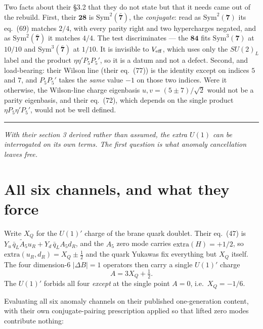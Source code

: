 \documentclass[11pt,a4paper]{article}
\newcommand{\su}[1]{SU(#1)}
\newcommand{\rep}[1]{\mathbf{#1}}
\newcommand{\bridge}[1]{\par\medskip\noindent
  \textcolor{hdrblue!45}{\rule{2.2cm}{0.6pt}}\;\;\parbox[t]{0.84\textwidth}{\small\itshape
  \textcolor{hdrblue!85}{#1}}\par\medskip}
\begin{document}
Two facts about their \S3.2 that they do not state but that it needs came out of the rebuild. First,
their $\rep{28}$ is $\mathrm{Sym}^2(\rep{\bar7})$, the \emph{conjugate}: read as
$\mathrm{Sym}^2(\rep7)$ its eq.~(69) matches $2/4$, with every parity right and two hypercharges
negated, and as $\mathrm{Sym}^2(\rep{\bar7})$ it matches $4/4$. The test discriminates --- the
$\rep{84}$ fits $\mathrm{Sym}^3(\rep7)$ at $10/10$ and $\mathrm{Sym}^3(\rep{\bar7})$ at $1/10$. It
is invisible to $V_{\rm eff}$, which uses only the $\su2_L$ label and the product
$\eta\eta'P_5P_5'$, so it is a datum and not a defect. Second, and load-bearing: their Wilson line
(their eq.~(77)) is the identity except on indices $5$ and $7$, and $P_5P_5'$ takes the \emph{same}
value $-1$ on those two indices. Were it otherwise, the Wilson-line charge eigenbasis
$u,v=(5\pm7)/\sqrt2$ would not be a parity eigenbasis, and their eq.~(72), which depends on the
single product $\eta P_5\eta'P_5'$, would not be well defined.

\bridge{With their section 3 derived rather than assumed, the extra $U(1)$ can be interrogated on
its own terms. The first question is what anomaly cancellation leaves free.}

\section{All six channels, and what they force}\label{sec:anom}

Write $X_Q$ for the $U(1)'$ charge of the brane quark doublet. Their eq.~(47) is
$Y_u\,\bar q_L\tilde A_5 u_R+Y_d\,\bar q_L A_5 d_R$, and the $A_5$ zero mode carries
$\mathrm{extra}(H)=+1/2$, so $\mathrm{extra}(u_R,d_R)=X_Q\pm\tfrac12$ and the quark Yukawas fix
everything but $X_Q$ itself. The four dimension-6 $|\Delta B|=1$ operators then carry a single
$U(1)'$ charge
\begin{equation}\label{eq:A}
A=3X_Q+\tfrac12 .
\end{equation}
The $U(1)'$ forbids all four \emph{except} at the single point $A=0$, i.e.\ $X_Q=-1/6$.

Evaluating all six anomaly channels on their published one-generation content, with their own
conjugate-pairing prescription applied so that lifted zero modes contribute nothing:
\end{document}
